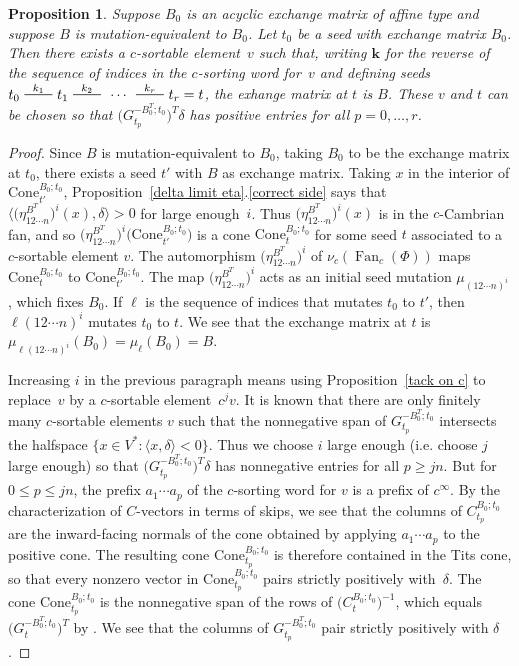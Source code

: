 \documentclass[10pt]{article}
\newtheorem{proposition}{Proposition}[section]
\theoremstyle{definition}
\theoremstyle{remark}
\numberwithin{equation}{section}
\newcommand{\edge}{\,\,\rule[2.7pt]{20pt}{0.5pt}\,\,}
\newcommand{\set}[1]{{\lbrace #1 \rbrace}}
\newcommand{\br}[1]{{\langle #1 \rangle}}
\newcommand{\0}{{\mathbf{0}}}
\newcommand{\Cone}{\mathrm{Cone}}
\newcommand{\kk}{{\boldsymbol{k}}}
\renewcommand{\ll}{{\boldsymbol\ell}}
\newcommand{\Fan}{\operatorname{Fan}}
\newcommand{\RSChar}{\Phi}
\newcommand{\RS}{\RSChar}
\begin{document}
\begin{proposition}\label{any B is sort}
Suppose $B_0$ is an acyclic exchange matrix of affine type and suppose $B$ is mutation-equivalent to $B_0$.
Let $t_0$ be a seed with exchange matrix $B_0$.
Then there exists a $c$-sortable element~$v$ such that, writing $\kk$ for the \emph{reverse} of the sequence of indices in the $c$-sorting word for~$v$ and defining seeds ${t_0\overset{k_1}{\edge}t_1\overset{k_2}{\edge}\,\cdots\,\overset{k_r}{\edge}t_r=t}$, the exhange matrix at $t$ is $B$.
These $v$ and $t$ can be chosen so that $\bigl(G_{t_p}^{-B_0^T;t_0}\bigr)^T\delta$ has positive entries for all ${p=0,\ldots,r}$.
\end{proposition}
\begin{proof}
Since $B$ is mutation-equivalent to $B_0$, taking $B_0$ to be the exchange matrix at $t_0$, there exists a seed $t'$ with $B$ as exchange matrix.
Taking $x$ in the interior of $\Cone^{B_0;t_0}_{t'}$, Proposition~\ref{delta limit eta}.\ref{correct side} says that $\br{\bigl(\eta_{12\cdots n}^{B^T}\bigr)^i(x),\delta}>0$  for large enough~$i$.
Thus $\bigl(\eta_{12\cdots n}^{B^T}\bigr)^i(x)$ is in the $c$-Cambrian fan, and so $\bigl(\eta_{12\cdots n}^{B^T}\bigr)^i\bigl(\Cone^{B_0;t_0}_{t'}\bigr)$ is a cone $\Cone^{B_0;t_0}_t$ for some seed $t$ associated to a $c$-sortable element $v$.
The automorphism $\bigl(\eta_{12\cdots n}^{B^T}\bigr)^i$ of $\nu_c(\Fan_c(\RS))$ maps $\Cone^{B_0;t_0}_t$ to $\Cone^{B_0;t_0}_{t'}$.
The map $\bigl(\eta_{12\cdots n}^{B^T}\bigr)^i$ acts as an initial seed mutation $\mu_{(12\cdots n)^i}$, which fixes $B_0$.
If $\ll$ is the sequence of indices that mutates $t_0$ to $t'$, then $\ll(12\cdots n)^i$ mutates $t_0$ to $t$.
We see that the exchange matrix at $t$ is $\mu_{\ll(12\cdots n)^i}(B_0)=\mu_\ll(B_0)=B$.

Increasing $i$ in the previous paragraph means using Proposition~\ref{tack on c} to replace~$v$ by a $c$-sortable element~$c^jv$.
It is known \cite[Proposition~4.6]{afframe} that there are only finitely many $c$-sortable elements $v$ such that the nonnegative span of $G_{t_p}^{-B_0^T;t_0}$ intersects the halfspace $\set{x\in V^*:\br{x,\delta}<0}$. 
Thus we choose $i$ large enough (i.e. choose $j$ large enough) so that $\bigl(G_{t_p}^{-B_0^T;t_0}\bigr)^T\delta$ has nonnegative entries for all $p\ge jn$.
But for $0\le p\le jn$, the prefix $a_1\cdots a_p$ of the $c$-sorting word for $v$ is a prefix of $c^\infty$.
By the characterization of $C$-vectors in terms of skips, we see that the columns of $C_{t_p}^{B_0;t_0}$ are the inward-facing normals of the cone obtained by applying $a_1\cdots a_p$ to the positive cone.
The resulting cone $\Cone^{B_0;t_0}_{t_p}$ is therefore contained in the Tits cone,
so that every nonzero vector in $\Cone^{B_0;t_0}_{t_p}$ pairs strictly positively with~$\delta$.
The cone $\Cone^{B_0;t_0}_{t_p}$ is the nonnegative span of the rows of $\bigl(C_t^{B_0;t_0}\bigr)^{-1}$, which equals $\bigl(G_t^{-B_0^T;t_0}\bigr)^T$ by \cite[Theorem~1.2]{NZ}.
We see that the columns of $G_{t_p}^{-B_0^T;t_0}$ pair strictly positively with $\delta$.
\end{proof}
\end{document}
